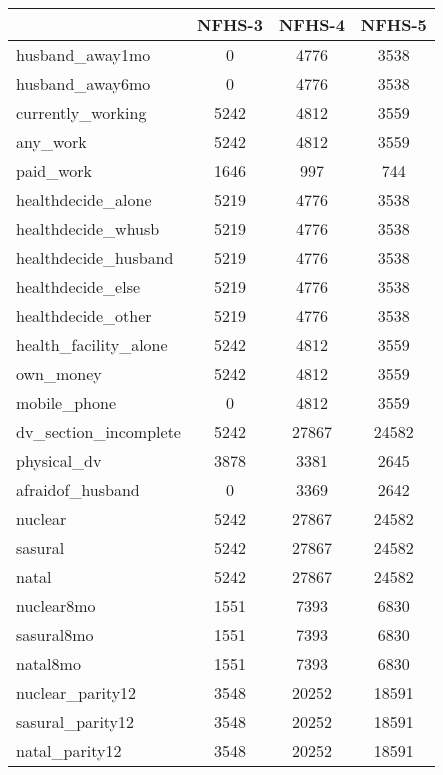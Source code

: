\begin{tabular}{l*{3}{c}}
\toprule
            &\multicolumn{1}{c}{NFHS-3}&\multicolumn{1}{c}{NFHS-4}&\multicolumn{1}{c}{NFHS-5}\\
\midrule
\midrule
husband\_away1mo&           0&        4776&        3538\\
husband\_away6mo&           0&        4776&        3538\\
currently\_working&        5242&        4812&        3559\\
any\_work    &        5242&        4812&        3559\\
paid\_work   &        1646&         997&         744\\
healthdecide\_alone&        5219&        4776&        3538\\
healthdecide\_whusb&        5219&        4776&        3538\\
healthdecide\_husband&        5219&        4776&        3538\\
healthdecide\_else&        5219&        4776&        3538\\
healthdecide\_other&        5219&        4776&        3538\\
health\_facility\_alone&        5242&        4812&        3559\\
own\_money   &        5242&        4812&        3559\\
mobile\_phone&           0&        4812&        3559\\
dv\_section\_incomplete&        5242&       27867&       24582\\
physical\_dv &        3878&        3381&        2645\\
afraidof\_husband&           0&        3369&        2642\\
nuclear     &        5242&       27867&       24582\\
sasural     &        5242&       27867&       24582\\
natal       &        5242&       27867&       24582\\
nuclear8mo  &        1551&        7393&        6830\\
sasural8mo  &        1551&        7393&        6830\\
natal8mo    &        1551&        7393&        6830\\
nuclear\_parity12&        3548&       20252&       18591\\
sasural\_parity12&        3548&       20252&       18591\\
natal\_parity12&        3548&       20252&       18591\\
\bottomrule
\end{tabular}
